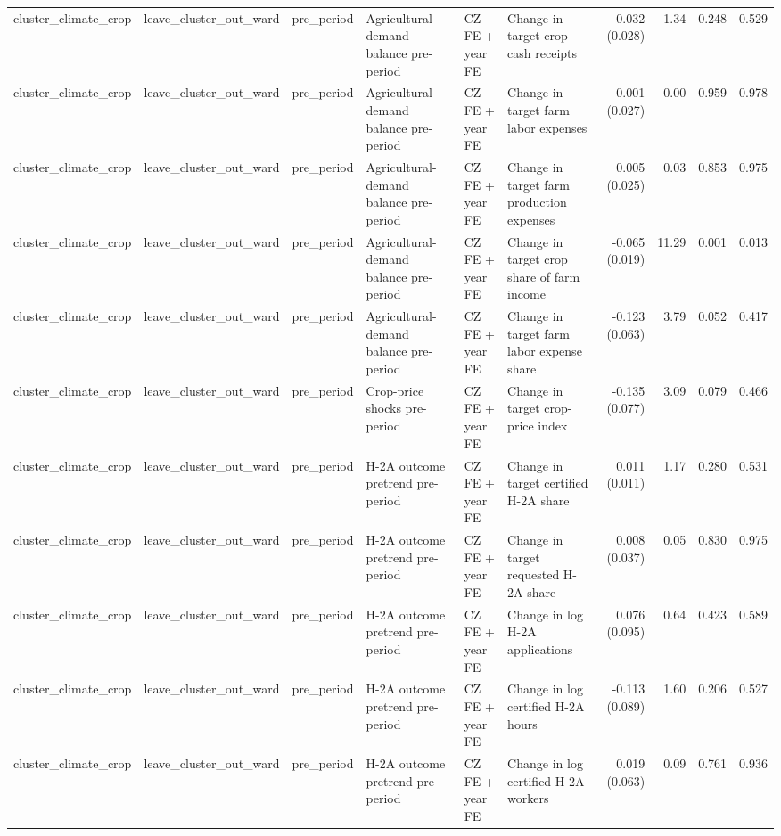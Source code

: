 \begin{tabular}{llllllrrrr}
cluster_climate_crop & leave_cluster_out_ward & pre_period & Agricultural-demand balance pre-period & CZ FE + year FE & Change in target crop cash receipts & -0.032 (0.028) & 1.34 & 0.248 & 0.529 \\
cluster_climate_crop & leave_cluster_out_ward & pre_period & Agricultural-demand balance pre-period & CZ FE + year FE & Change in target farm labor expenses & -0.001 (0.027) & 0.00 & 0.959 & 0.978 \\
cluster_climate_crop & leave_cluster_out_ward & pre_period & Agricultural-demand balance pre-period & CZ FE + year FE & Change in target farm production expenses & 0.005 (0.025) & 0.03 & 0.853 & 0.975 \\
cluster_climate_crop & leave_cluster_out_ward & pre_period & Agricultural-demand balance pre-period & CZ FE + year FE & Change in target crop share of farm income & -0.065 (0.019) & 11.29 & 0.001 & 0.013 \\
cluster_climate_crop & leave_cluster_out_ward & pre_period & Agricultural-demand balance pre-period & CZ FE + year FE & Change in target farm labor expense share & -0.123 (0.063) & 3.79 & 0.052 & 0.417 \\
cluster_climate_crop & leave_cluster_out_ward & pre_period & Crop-price shocks pre-period & CZ FE + year FE & Change in target crop-price index & -0.135 (0.077) & 3.09 & 0.079 & 0.466 \\
cluster_climate_crop & leave_cluster_out_ward & pre_period & H-2A outcome pretrend pre-period & CZ FE + year FE & Change in target certified H-2A share & 0.011 (0.011) & 1.17 & 0.280 & 0.531 \\
cluster_climate_crop & leave_cluster_out_ward & pre_period & H-2A outcome pretrend pre-period & CZ FE + year FE & Change in target requested H-2A share & 0.008 (0.037) & 0.05 & 0.830 & 0.975 \\
cluster_climate_crop & leave_cluster_out_ward & pre_period & H-2A outcome pretrend pre-period & CZ FE + year FE & Change in log H-2A applications & 0.076 (0.095) & 0.64 & 0.423 & 0.589 \\
cluster_climate_crop & leave_cluster_out_ward & pre_period & H-2A outcome pretrend pre-period & CZ FE + year FE & Change in log certified H-2A hours & -0.113 (0.089) & 1.60 & 0.206 & 0.527 \\
cluster_climate_crop & leave_cluster_out_ward & pre_period & H-2A outcome pretrend pre-period & CZ FE + year FE & Change in log certified H-2A workers & 0.019 (0.063) & 0.09 & 0.761 & 0.936 \\

\end{tabular}
